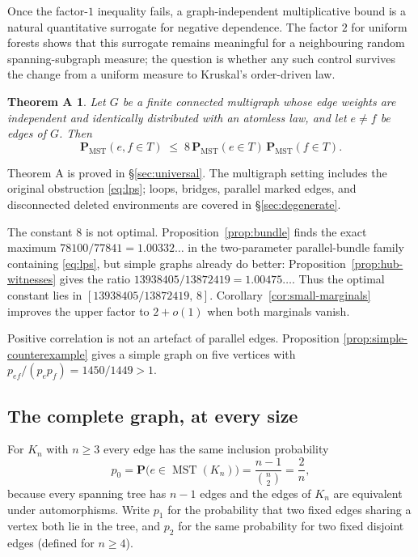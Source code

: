 \documentclass[10pt,a4paper]{amsart}
\newtheorem*{theoremA}{Theorem A}
\newcommand{\MST}{\operatorname{MST}}
\newcommand{\PMST}{\mathbf{P}_{\mathrm{MST}}}
\newcommand{\PP}{\mathbf{P}}
\begin{document}
Once the factor-$1$ inequality fails, a graph-independent multiplicative bound
is a natural quantitative surrogate for negative dependence. The factor $2$ for
uniform forests shows that this surrogate remains meaningful for a neighbouring
random spanning-subgraph measure; the question is whether any such control
survives the change from a uniform measure to Kruskal's order-driven law.

\begin{theoremA}
Let $G$ be a finite connected multigraph whose edge weights are independent and
identically distributed with an atomless law, and let $e\ne f$ be edges of $G$.
Then
\[
\PMST(e,f\in T)\;\le\;8\,\PMST(e\in T)\,\PMST(f\in T).
\]
\end{theoremA}

Theorem A is proved in \S\ref{sec:universal}. The multigraph setting includes
the original obstruction \eqref{eq:lps}; loops, bridges, parallel marked edges,
and disconnected deleted environments are covered in
\S\ref{sec:degenerate}.

The constant $8$ is not optimal. Proposition~\ref{prop:bundle} finds the exact
maximum $78100/77841=1.00332\ldots$ in the two-parameter parallel-bundle family
containing \eqref{eq:lps}, but simple graphs already do better:
Proposition~\ref{prop:hub-witnesses} gives the ratio
$13938405/13872419=1.00475\ldots$. Thus the optimal constant lies in
$[13938405/13872419,\,8]$. Corollary~\ref{cor:small-marginals} improves the
upper factor to $2+o(1)$ when both marginals vanish.

Positive correlation is not an artefact of parallel edges. Proposition
\ref{prop:simple-counterexample} gives a simple graph on five vertices with
$p_{ef}/(p_ep_f)=1450/1449>1$.

\subsection{The complete graph, at every size}
\label{ssec:introB}

For $K_n$ with $n\ge3$ every edge has the same inclusion probability
\begin{equation}
\label{eq:p0}
p_0=\PP\bigl(e\in\MST(K_n)\bigr)=\frac{n-1}{\binom n2}=\frac2n ,
\end{equation}
because every spanning tree has $n-1$ edges and the edges of $K_n$ are
equivalent under automorphisms. Write $p_1$ for the probability that two fixed
edges sharing a vertex both lie in the tree, and $p_2$ for the same probability
for two fixed disjoint edges (defined for $n\ge4$).
\end{document}
